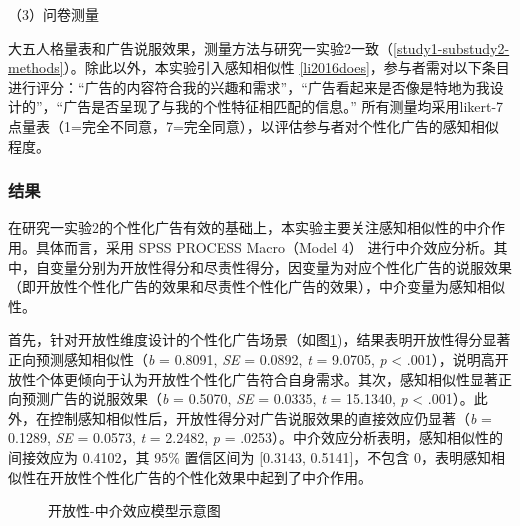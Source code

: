 （3）问卷测量

大五人格量表和广告说服效果，测量方法与研究一实验2一致（\ref{study1-substudy2-methods}）。除此以外，本实验引入感知相似性 \ref{li2016does}，参与者需对以下条目进行评分：“广告的内容符合我的兴趣和需求”，“广告看起来是否像是特地为我设计的”，“广告是否呈现了与我的个性特征相匹配的信息。” 所有测量均采用likert-7点量表（1=完全不同意，7=完全同意），以评估参与者对个性化广告的感知相似程度。

\subsubsection{结果}

在研究一实验2的个性化广告有效的基础上，本实验主要关注感知相似性的中介作用。具体而言，采用 SPSS PROCESS Macro（Model 4） 进行中介效应分析。其中，自变量分别为开放性得分和尽责性得分，因变量为对应个性化广告的说服效果（即开放性个性化广告的效果和尽责性个性化广告的效果），中介变量为感知相似性。

首先，针对开放性维度设计的个性化广告场景（如图\ref{fig:openness-mediation_model})，结果表明开放性得分显著正向预测感知相似性（\textit{b} = 0.8091, \textit{SE} = 0.0892, \textit{t} = 9.0705, \textit{p} < .001），说明高开放性个体更倾向于认为开放性个性化广告符合自身需求。其次，感知相似性显著正向预测广告的说服效果（\textit{b} = 0.5070, \textit{SE} = 0.0335, \textit{t} = 15.1340, \textit{p} < .001）。此外，在控制感知相似性后，开放性得分对广告说服效果的直接效应仍显著（\textit{b} = 0.1289, \textit{SE} = 0.0573, \textit{t} = 2.2482, \textit{p} = .0253）。中介效应分析表明，感知相似性的间接效应为 0.4102，其 95\% 置信区间为 [0.3143, 0.5141]，不包含 0，表明感知相似性在开放性个性化广告的个性化效果中起到了中介作用。

\begin{figure}[H] %
    \centering
    \caption{开放性-中介效应模型示意图}
    \label{fig:openness-mediation_model} %
\end{figure}

